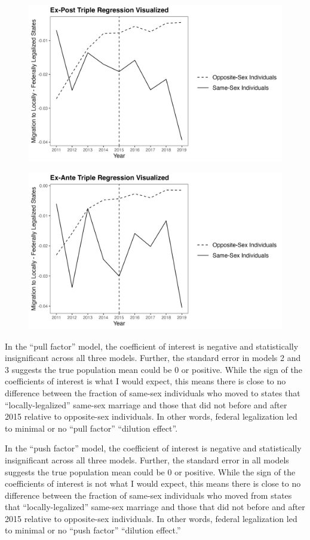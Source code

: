 \documentclass[12pt,letterpaper]{article}
\begin{document}
\begin{centering} %
\begin{figure}
    \includegraphics[width=0.75\linewidth]{outputs/summary_stats/post_diffs.png}
    \caption{}
    \label{fig: post_diffs}
\end{figure}

\begin{figure}
    \centering
    \includegraphics[width=0.75\linewidth]{outputs/summary_stats/ante_diffs.png}
    \caption{}
    \label{fig: ante_diffs}
\end{figure}
\end{centering}

In the “pull factor” model, the coefficient of interest is negative and statistically insignificant across all three models. Further, the standard error in models 2 and 3 suggests the true population mean could be 0 or positive. While the sign of the coefficients of interest is what I would expect, this means there is close to no difference between the fraction of same-sex individuals who moved to states that “locally-legalized” same-sex marriage and those that did not before and after 2015 relative to opposite-sex individuals. In other words, federal legalization led to minimal or no “pull factor” “dilution effect”. 

In the “push factor” model, the coefficient of interest is negative and statistically insignificant across all three models. Further, the standard error in all models suggests the true population mean could be 0 or positive. While the sign of the coefficients of interest is not what I would expect, this means there is close to no difference between the fraction of same-sex individuals who moved from states that “locally-legalized” same-sex marriage and those that did not before and after 2015 relative to opposite-sex individuals. In other words, federal legalization led to minimal or no “push factor” “dilution effect.”  
\end{document}
